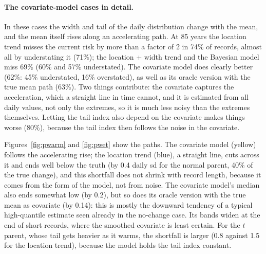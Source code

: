 \documentclass[11pt]{article}
\begin{document}
\paragraph{The covariate-model cases in detail.}
In these cases the width and tail of the daily distribution change with the mean, and the mean
itself rises along an accelerating path. At 85 years the location trend misses the current risk by
more than a factor of 2 in 74\% of records, almost all by understating it (71\%); the location +
width trend and the Bayesian model miss 69\% (60\% and 57\% understated). The covariate model does
clearly better (62\%: 45\% understated, 16\% overstated), as well as its oracle version with the true
mean path (63\%). Two things contribute: the covariate
captures the acceleration, which a straight line in time cannot, and it is estimated from all daily
values, not only the extremes, so it is much less noisy than the extremes themselves. Letting the
tail index also depend on the covariate makes things worse (80\%), because the tail index then
follows the noise in the covariate.

Figures~\ref{fig:pwarm} and \ref{fig:pwet} show the paths. The covariate model (yellow) follows
the accelerating rise; the location trend (blue), a straight line, cuts across it and ends well below
the truth (by 0.4 daily sd for the normal parent, 40\% of the true change), and this shortfall
does not shrink with record length, because it comes from the form of the model, not from noise.
The covariate model's median also ends somewhat low (by 0.2), but so does its oracle version with the
true mean as covariate (by 0.14): this is mostly the downward tendency of a typical high-quantile
estimate seen already in the no-change case. Its bands widen at the end of short records, where the
smoothed covariate is least certain. For the $t$ parent, whose tail gets heavier as it warms, the
shortfall is larger (0.8 against 1.5 for the location trend), because the model holds the tail index
constant.
\end{document}
